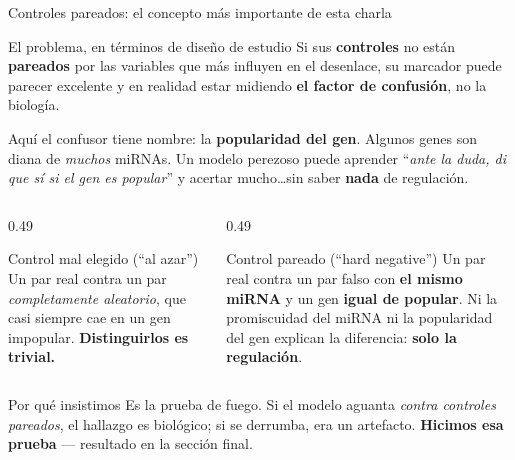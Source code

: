 
\begin{frame}{Controles pareados: el concepto m\'as importante de esta charla}
  \begin{block}{El problema, en t\'erminos de dise\~no de estudio}
    \small
    Si sus \textbf{controles} no est\'an \textbf{pareados} por las variables que m\'as influyen en el desenlace, su marcador puede parecer excelente y en realidad estar midiendo \textbf{el factor de confusi\'on}, no la biolog\'ia.
  \end{block}

  \vspace{0.2em}
  \scriptsize
  Aqu\'i el confusor tiene nombre: la \textbf{popularidad del gen}. Algunos genes son diana de \emph{muchos} miRNAs. Un modelo perezoso puede aprender ``\emph{ante la duda, di que s\'i si el gen es popular}'' y acertar mucho\ldots sin saber \textbf{nada} de regulaci\'on.

  \vspace{0.2em}
  \begin{columns}[T]
    \begin{column}{0.49\textwidth}
      \begin{block}{Control mal elegido (``al azar'')}
        \scriptsize
        Un par real contra un par \emph{completamente aleatorio}, que casi siempre cae en un gen impopular. \textbf{Distinguirlos es trivial.}
      \end{block}
    \end{column}
    \begin{column}{0.49\textwidth}
      \begin{block}{Control pareado (``hard negative'')}
        \scriptsize
        Un par real contra un par falso con \textbf{el mismo miRNA} y un gen \textbf{igual de popular}. Ni la promiscuidad del miRNA ni la popularidad del gen explican la diferencia: \textbf{solo la regulaci\'on}.
      \end{block}
    \end{column}
  \end{columns}

  \vspace{0.3em}
  \begin{block}{Por qu\'e insistimos}
    \scriptsize
    Es la prueba de fuego. Si el modelo aguanta \emph{contra controles pareados}, el hallazgo es biol\'ogico; si se derrumba, era un artefacto. \textbf{Hicimos esa prueba} --- resultado en la secci\'on final.
  \end{block}
\end{frame}

